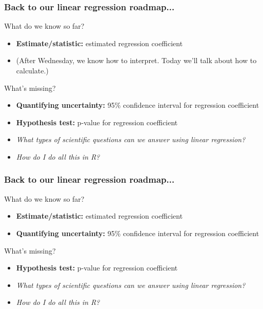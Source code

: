 \documentclass[12pt, 
hyperref={colorlinks=true, linkcolor=blue, urlcolor=cyan}]{beamer}
\begin{document}
\begin{frame}
\frametitle{Back to our linear regression roadmap...}
\color{blue} What do we know so far? \color{black}%
\begin{itemize}
\item \textbf{Estimate/statistic:} estimated regression coefficient
\item[] (After Wednesday, we know how to interpret. Today we'll talk about how to calculate.)
\end{itemize}

\color{blue} What's missing? \color{black} %
\begin{itemize}
\item \textbf{Quantifying uncertainty:} 95\% confidence interval for regression coefficient
\item \textbf{Hypothesis test:} p-value for regression coefficient 
\item \textit{What types of scientific questions can we answer using linear regression?}
\item \textit{How do I do all this in R?}
\end{itemize}
\end{frame}

\begin{frame}[noframenumbering]
\frametitle{Back to our linear regression roadmap...}
\color{blue} What do we know so far? \color{black}%
\begin{itemize}
\item \textbf{Estimate/statistic:} estimated regression coefficient
\item \textbf{Quantifying uncertainty:} 95\% confidence interval for regression coefficient
\end{itemize}

\color{blue} What's missing? \color{black} %
\begin{itemize}
\item \textbf{Hypothesis test:} p-value for regression coefficient 
\item \textit{What types of scientific questions can we answer using linear regression?}
\item \textit{How do I do all this in R?}
\end{itemize}
\end{frame}
\end{document}
